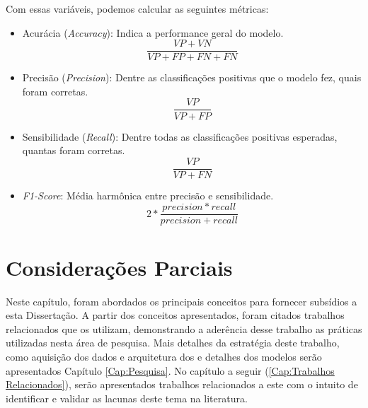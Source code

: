 Com essas variáveis, podemos calcular as seguintes métricas:

\begin{itemize}
    \item Acurácia (\textit{Accuracy}): Indica a performance geral do modelo.
        \begin{equation}
        \frac{VP + VN}{VP+FP+FN+FN}
        \end{equation}
    \item Precisão (\textit{Precision}): Dentre as classificações positivas que o modelo fez, quais foram corretas.
        \begin{equation}
        \frac{VP}{VP+FP}
        \end{equation}
    \item Sensibilidade (\textit{Recall}): Dentre todas as classificações positivas esperadas, quantas foram corretas.
        \begin{equation}
        \frac{VP}{VP+FN}
        \end{equation}
    \item \textit{F1-Score}: Média harmônica entre precisão e sensibilidade.
        \begin{equation}
        2 * \frac{precision  * recall}{precision + recall}
        \end{equation}
\end{itemize}

\section{Considerações Parciais}

Neste capítulo, foram abordados os principais conceitos para fornecer subsídios a esta Dissertação. A partir dos conceitos apresentados, foram citados trabalhos relacionados que os utilizam, demonstrando a aderência desse trabalho as práticas utilizadas nesta área de pesquisa. Mais detalhes da estratégia deste trabalho, como aquisição dos dados e arquitetura dos e detalhes dos modelos serão apresentados Capítulo \ref{Cap:Pesquisa}. No capítulo a seguir (\ref{Cap:Trabalhos Relacionados}), serão apresentados trabalhos relacionados a este com o intuito de identificar e validar as lacunas deste tema na literatura. 

